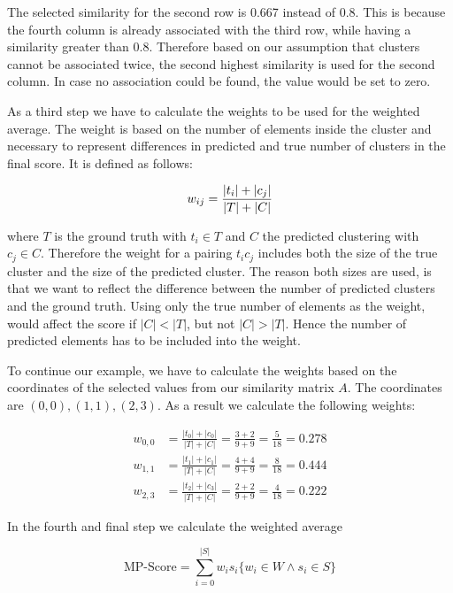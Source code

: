 The selected similarity for the second row is 0.667 instead of 0.8.
This is because the fourth column is already associated with the third row, while having a similarity greater than 0.8.
Therefore based on our assumption that clusters cannot be associated twice,
the second highest similarity is used for the second column.
In case no association could be found, the value would be set to zero.

As a third step we have to calculate the weights to be used for the weighted average.
The weight is based on the number of elements inside the cluster
and necessary to represent differences in predicted and true number of clusters in the final score.
It is defined as follows:

\begin{equation}
    \label{equ:weight}
        w_{ij} = \frac{|t_i| + |c_j|}{|T|+|C|} \\
\end{equation}

where $T$ is the ground truth with $t_i \in T$ and $C$ the predicted clustering with  $c_j \in C$.
Therefore the weight for a pairing $t_ic_j$ includes both the size of the true cluster
and the size of the predicted cluster.
The reason both sizes are used,
is that we want to reflect the difference between the number of predicted clusters and the ground truth.
Using only the true number of elements as the weight, would affect the score if $|C| < |T|$, but not $|C| > |T|$.
Hence the number of predicted elements has to be included into the weight.

To continue our example,
we have to calculate the weights based on the coordinates of the selected values from our similarity matrix $A$.
The coordinates are $(0,0), (1,1), (2,3)$.
As a result we calculate the following weights:

\begin{align*}
    w_{0,0} &= \frac{|t_0| + |c_0|}{|T|+|C|} = \frac{3 + 2}{9 + 9} = \frac{5}{18} = 0.278 \\
    w_{1,1} &= \frac{|t_1| + |c_1|}{|T|+|C|} = \frac{4 + 4}{9 + 9} = \frac{8}{18} = 0.444 \\
    w_{2,3} &= \frac{|t_2| + |c_3|}{|T|+|C|} = \frac{2 + 2}{9 + 9} = \frac{4}{18} = 0.222
\end{align*}

In the fourth and final step we calculate the weighted average

\begin{equation}
    \label{equ:weighted_average}
        \text{MP-Score} = \sum_{i=0}^{|S|} w_is_i \{w_i \in W \wedge s_i \in S\}
\end{equation}

